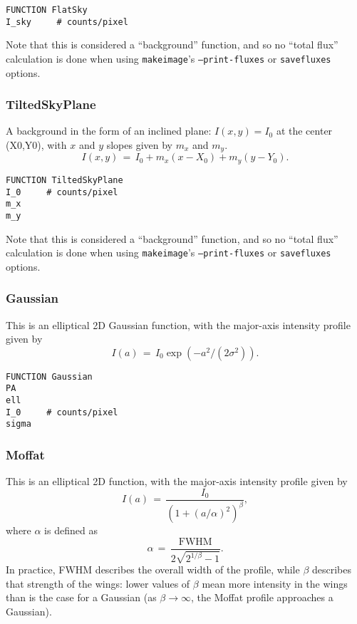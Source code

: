 \documentclass[10pt,a4paper,article]{memoir}
\begin{document}
\begin{verbatim}
FUNCTION FlatSky
I_sky     # counts/pixel
\end{verbatim}

Note that this is considered a ``background'' function, and so no ``total flux''
calculation is done when using \texttt{makeimage}'s \texttt{--print-fluxes} or
\texttt{savefluxes} options.


\subsubsection{TiltedSkyPlane}

A background in the form of an inclined plane: $I(x,y) = I_0$ at the center
(X0,Y0), with $x$ and $y$ slopes given by $m_x$ and $m_y$.
\begin{equation}
I(x,y) \, = \, I_{0} + m_{x} (x - X_{0}) + m_{y} (y - Y_{0}).
\end{equation}

\begin{verbatim}
FUNCTION TiltedSkyPlane
I_0     # counts/pixel
m_x
m_y
\end{verbatim}

Note that this is considered a ``background'' function, and so no ``total flux''
calculation is done when using \texttt{makeimage}'s \texttt{--print-fluxes} or
\texttt{savefluxes} options.


\subsubsection{Gaussian}

This is an elliptical 2D Gaussian function, with the major-axis intensity
profile given by
\begin{equation}
I(a) \, = \, I_{0} \exp(-a^2/(2 \sigma^2)).
\end{equation}

\begin{verbatim}
FUNCTION Gaussian
PA
ell
I_0     # counts/pixel
sigma
\end{verbatim}


\subsubsection{Moffat}

This is an elliptical 2D \citet{moffat69} function, with the major-axis intensity profile
given by
\begin{equation}
I(a) \, = \, \frac{I_{0}  }{(1 + (a/\alpha)^{2})^{\beta} },
\end{equation}
where $\alpha$ is defined as
\begin{equation}
\alpha \, = \, \frac{ {\mathrm{FWHM}}}{2 \sqrt{2^{1/\beta} - 1}}.
\end{equation}
In practice, FWHM describes the overall width of the profile, while $\beta$ describes that
strength of the wings: lower values of $\beta$ mean more intensity in the wings
than is the case for a Gaussian (as $\beta \rightarrow \infty$, the Moffat profile
approaches a Gaussian).
\end{document}
